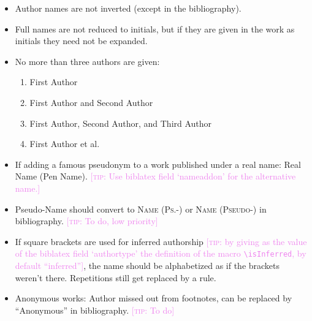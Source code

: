 \documentclass[extrafontsizes,11pt,a4paper,oneside]{memoir}
\newcommand*{\code}[1]{`\textsf{#1}'}
\newcommand*{\aside}[1]{\textcolor{violet}{[\textsc{tip:} #1]}}
\begin{document}
\begin{itemize}
  \item Author names are not inverted (except in the bibliography).
  
  \item Full names are not reduced to initials, but if they are given in the work as initials they need not be expanded.
  
  \item No more than three authors are given:
  \begin{enumerate}
    \item First Author
    \\
    
    \item First Author and Second Author
    \\
    
    \item First Author, Second Author, and Third Author
    \\
    
    \item First Author et al.
    \\ %
  \end{enumerate}
  
  \item If adding a famous pseudonym to a work published under a real name: Real Name (Pen Name). \aside{Use \textsf{biblatex} field \code{nameaddon} for the alternative name.}\\
  
  \item Pseudo-Name should convert to \textsc{Name (Ps.-)} or \textsc{Name (Pseudo-)} in bibliography. \aside{To do, low priority}
  
  \item If square brackets are used for inferred authorship \aside{by giving as the value of the \textsf{biblatex} field \code{authortype} the definition of the macro \texttt{\textbackslash isInferred}, by default \enquote{inferred}}, the name should be alphabetized as if the brackets weren't there. Repetitions still get replaced by a rule.\\
  
  \item Anonymous works: Author missed out from footnotes, can be replaced by \enquote{Anonymous} in bibliography. \aside{To do}
  \\
  \\
\end{itemize}
\end{document}

